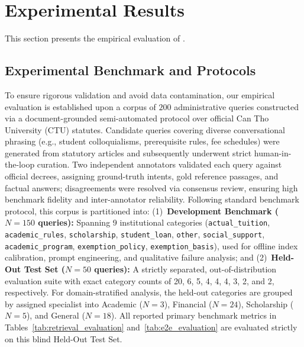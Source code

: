 \section{Experimental Results}
\label{sec:exp}

This section presents the empirical evaluation of \system{}.

\subsection{Experimental Benchmark and Protocols}
\label{sec:dataset}

To ensure rigorous validation and avoid data contamination, our empirical evaluation is established upon a corpus of $200$ administrative queries constructed via a document-grounded semi-automated protocol over official Can Tho University (CTU) statutes. Candidate queries covering diverse conversational phrasing (e.g., student colloquialisms, prerequisite rules, fee schedules) were generated from statutory articles and subsequently underwent strict human-in-the-loop curation. Two independent annotators validated each query against official decrees, assigning ground-truth intents, gold reference passages, and factual answers; disagreements were resolved via consensus review, ensuring high benchmark fidelity and inter-annotator reliability. Following standard benchmark protocol, this corpus is partitioned into: (1)~\textbf{Development Benchmark ($N=150$ queries):} Spanning 9 institutional categories (\texttt{actual\_tuition}, \texttt{academic\_rules}, \texttt{scholarship}, \texttt{student\_loan}, \texttt{other}, \texttt{social\_support}, \texttt{academic\_program}, \texttt{exemption\_policy}, \texttt{exemption\_basis}), used for offline index calibration, prompt engineering, and qualitative failure analysis; and (2)~\textbf{Held-Out Test Set ($N=50$ queries):} A strictly separated, out-of-distribution evaluation suite with exact category counts of 20, 6, 5, 4, 4, 4, 3, 2, and 2, respectively. For domain-stratified analysis, the held-out categories are grouped by assigned specialist into Academic ($N=3$), Financial ($N=24$), Scholarship ($N=5$), and General ($N=18$). All reported primary benchmark metrics in Tables~\ref{tab:retrieval_evaluation} and~\ref{tab:e2e_evaluation} are evaluated strictly on this blind Held-Out Test Set.

